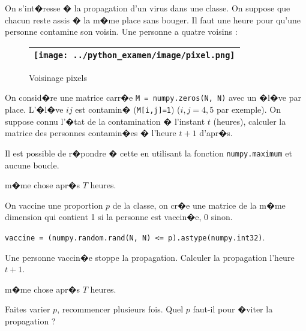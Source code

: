\newpage



\exosubject{}
\begin{xexercice}\label{td_note_label2_2021}%

On s'int�resse � la propagation d'un virus dans une classe. On suppose que chacun reste assis � la m�me place sans bouger. Il faut une heure pour qu'une personne contamine son voisin. Une personne a quatre voisins :

\begin{figure}[ht]
\begin{center}\begin{tabular}{|c|}\hline 
\texttt{[image: ../python\_examen/image/pixel.png]} \\ \hline
\end{tabular}
\end{center}
\caption{Voisinage pixels}
\label{voisinage_pixel}
\end{figure}


\exequest On consid�re une matrice carr�e \texttt{M = numpy.zeros(N, N)} avec un �l�ve par place. L'�l�ve $ij$ est contamin� (\texttt{M[i,j]=1}) ($i,j = 4,5$ par exemple). On suppose connu l'�tat de la contamination � l'instant $t$ (heures), calculer la matrice des personnes contamin�es � l'heure $t+1$ d'apr�s.

Il est possible de r�pondre � cette en utilisant la fonction \texttt{numpy.maximum} et aucune boucle.

\exequest m�me chose apr�s $T$ heures.

\exequest On vaccine une proportion $p$ de la classe, on cr�e une matrice de la m�me dimension qui contient 1 si la personne est vaccin�e, 0 sinon.

\texttt{vaccine = (numpy.random.rand(N, N) <= p).astype(numpy.int32)}.

Une personne vaccin�e stoppe la propagation. Calculer la propagation l'heure $t+1$.

\exequest m�me chose apr�s $T$ heures.

\exequest Faites varier $p$, recommencer plusieurs fois. Quel $p$ faut-il pour �viter la propagation ?


\end{xexercice}





%
